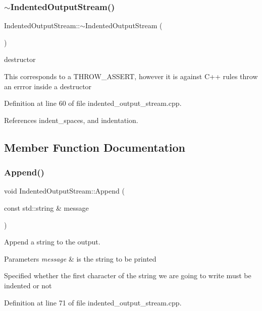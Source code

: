 \subsubsection{\texorpdfstring{$\sim$\+Indented\+Output\+Stream()}{~IndentedOutputStream()}}
{\footnotesize\ttfamily Indented\+Output\+Stream\+::$\sim$\+Indented\+Output\+Stream (\begin{DoxyParamCaption}{ }\end{DoxyParamCaption})}



destructor 

This corresponds to a T\+H\+R\+O\+W\+\_\+\+A\+S\+S\+E\+RT, however it is against C++ rules throw an errror inside a destructor 

Definition at line 60 of file indented\+\_\+output\+\_\+stream.\+cpp.



References indent\+\_\+spaces, and indentation.



\subsection{Member Function Documentation}
\mbox{\label{classIndentedOutputStream_ab9c200e93872397c9dd09bf8c2d8b651}} 
\subsubsection{\texorpdfstring{Append()}{Append()}}
{\footnotesize\ttfamily void Indented\+Output\+Stream\+::\+Append (\begin{DoxyParamCaption}\item[{const std\+::string \&}]{message }\end{DoxyParamCaption})}



Append a string to the output. 


\begin{DoxyParams}{Parameters}
{\em message} & is the string to be printed \\
\hline
\end{DoxyParams}
Specified whether the first character of the string we are going to write must be indented or not 

Definition at line 71 of file indented\+\_\+output\+\_\+stream.\+cpp.



